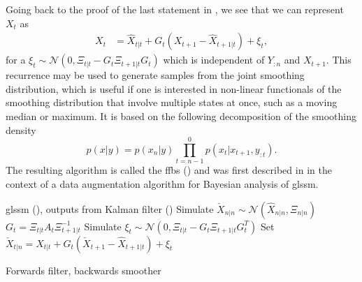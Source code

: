 Going back to the proof of the last statement in , we see that we can represent $X_{t}$ as
\begin{align}
    \label{eq:kalman-smoother-backwards-recursion}
    X_{t} &= \hat X_{t|t} + G_{t}(X_{t + 1} - \hat X_{t + 1 | t}) + \xi_{t},
\end{align}
for a $\xi_{t} \sim \mathcal N \left( 0, \Xi_{t | t} - G_{t} \Xi_{t + 1|t}G_{t} \right)$ which is independent of $Y_{:n}$ and $X_{t + 1}$.
This recurrence may be used to generate samples from the joint smoothing distribution, which is useful if one is interested in non-linear functionals of the smoothing distribution that involve multiple states at once, such as a moving median or maximum. It is based on the following decomposition of the smoothing density
$$
p(x|y) = p(x_{n}|y) \prod_{t = n - 1}^0 p(x_{t}|x_{t+1}, y_{:t}).
$$
The resulting algorithm is called the \gls{ffbs} () and was first described in \citep{Fruhwirth-Schnatter1994Data} in the context of a data augmentation algorithm for Bayesian analysis of \acrshort{glssm}. %

\begin{algorithm}
    \begin{algorithmic}[1]
        \Require \acrshort{glssm} (), outputs from Kalman filter ()
        \State Simulate $\check X_{n|n} \sim \mathcal N(\hat X_{n|n}, \Xi_{n|n})$
            \State $G_{t} = \Xi_{t|t}A_{t}\Xi^{-1}_{t + 1 | t}$
            \State Simulate $\xi_{t} \sim \mathcal N(0, \Xi_{t|t} - G_{t}\Xi_{t+1|t}G^{T}_t)$
            \State Set $\check X_{t|n} = \hat X_{t|t} + G_{t} \left( \check X_{t + 1} - \hat X_{t + 1| t} \right) + \xi_{t}$
        \EndFor
    \end{algorithmic}
    \caption{Forwards filter, backwards smoother \citep[Proposition 1]{Fruhwirth-Schnatter1994Data}} \label{alg:ffbs}
\end{algorithm}

